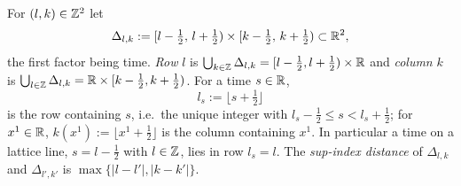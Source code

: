 \begin{auxdef}\label{aux:notation-squares}
For $(l,k)\in\mathbb{Z}^2$ let
\[
 \Delta_{l,k}:=[l-\tfrac12,\,l+\tfrac12)\times[k-\tfrac12,\,k+\tfrac12)\subset\mathbb{R}^2 ,
\]
the first factor being time.  \emph{Row} $l$ is $\bigcup_{k\in\mathbb{Z}}\Delta_{l,k}=[l-\frac12,
l+\frac12)\times\mathbb{R}$ and \emph{column} $k$ is $\bigcup_{l\in\mathbb{Z}}\Delta_{l,k}=\mathbb{R}\times
[k-\frac12,k+\frac12)$.  For a time $s\in\mathbb{R}$,
\[
 l_s:=\lfloor s+\tfrac12\rfloor
\]
is the row containing $s$, i.e.\ the unique integer with $l_s-\frac12\le s<l_s+\frac12$;
for $x^1\in\mathbb{R}$, $k(x^1):=\lfloor x^1+\frac12\rfloor$ is the column containing $x^1$.  In
particular a time on a lattice line, $s=l-\frac12$ with $l\in\mathbb{Z}$, lies in row $l_s=l$.  The
\emph{sup-index distance} of $\Delta_{l,k}$ and $\Delta_{l',k'}$ is
$\max\{|l-l'|,|k-k'|\}$.
\end{auxdef}

